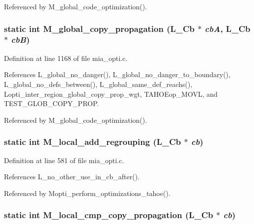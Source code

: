 Referenced by M\_\-global\_\-code\_\-optimization().
\subsubsection{\setlength{\rightskip}{0pt plus 5cm}static int M\_\-global\_\-copy\_\-propagation (L\_\-Cb $\ast$ {\em cb\-A}, L\_\-Cb $\ast$ {\em cb\-B})\hspace{0.3cm}{\tt  [static]}}\label{mia__opti_8c_3fb0912ca5bfeb41eb69edd4e45911b9}




Definition at line 1168 of file mia\_\-opti.c.

References L\_\-global\_\-no\_\-danger(), L\_\-global\_\-no\_\-danger\_\-to\_\-boundary(), L\_\-global\_\-no\_\-defs\_\-between(), L\_\-global\_\-same\_\-def\_\-reachs(), Lopti\_\-inter\_\-region\_\-global\_\-copy\_\-prop\_\-wgt, TAHOEop\_\-MOVL, and TEST\_\-GLOB\_\-COPY\_\-PROP.

Referenced by M\_\-global\_\-code\_\-optimization().
\subsubsection{\setlength{\rightskip}{0pt plus 5cm}static int M\_\-local\_\-add\_\-regrouping (L\_\-Cb $\ast$ {\em cb})\hspace{0.3cm}{\tt  [static]}}\label{mia__opti_8c_6f2dfadb3ed374c1b6a8569bcbf34e28}




Definition at line 581 of file mia\_\-opti.c.

References L\_\-no\_\-other\_\-use\_\-in\_\-cb\_\-after().

Referenced by Mopti\_\-perform\_\-optimizations\_\-tahoe().
\subsubsection{\setlength{\rightskip}{0pt plus 5cm}static int M\_\-local\_\-cmp\_\-copy\_\-propagation (L\_\-Cb $\ast$ {\em cb})\hspace{0.3cm}{\tt  [static]}}\label{mia__opti_8c_e06573b2db767a2f5ddc594506a1e09a}




